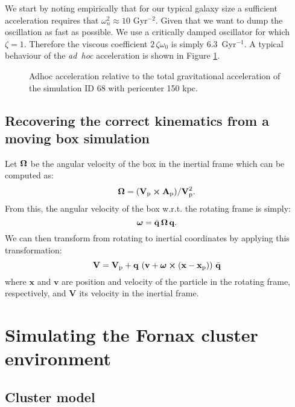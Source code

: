 We start by noting empirically that for our typical galaxy size a sufficient acceleration requires that $\omega_n^2\approx 10$ Gyr$^{-2}$.
Given that we want to dump the oscillation as fast as possible. We use a critically damped oscillator  for which $\zeta = 1$. Therefore the viscous coefficient $2\,\zeta\omega_0$ is simply $6.3$~Gyr$^{-1}$.
A typical behaviour of the \emph{ad~hoc} acceleration is shown in Figure \ref{fig:adhoc}.

\begin{figure} %
\centering
\caption{Adhoc acceleration relative to the total gravitational acceleration of the simulation ID 68 with pericenter 150 kpc.}
\label{fig:adhoc}
\end{figure}


\subsection{Recovering the correct kinematics from a moving box simulation}
\label{sec:corret_kinematics}
Let $\boldsymbol{\mathbf{\Omega}}$ be the angular velocity of the box in the inertial frame which can be computed as:
\begin{equation}
 \boldsymbol{\mathbf{\Omega}} = {(\boldsymbol{\mathbf{V}}_{\mathrm p}\cross\boldsymbol{\mathbf{A}}_{\mathrm p})}/{\boldsymbol{\mathbf{V}}_{\mathrm p}^2}.
\end{equation}
From this, the angular velocity of the box w.r.t. the rotating frame is simply:
\begin{equation}
\boldsymbol{\mathbf{\omega}} = \bar{\mathbf{q}}\, \boldsymbol{\mathbf{\Omega}}\, \mathbf{q}.
\end{equation}
We can then transform from rotating to inertial coordinates by applying this transformation:
\begin{equation}
\boldsymbol{\mathbf{V}} = \boldsymbol{\mathbf{V}}_{\mathrm p} + \mathbf{q} \, \left(\boldsymbol{\mathbf{v}} + \boldsymbol{\mathbf{\omega}} \cross (\boldsymbol{\mathbf{x}}-\boldsymbol{\mathbf{x}}_{\mathrm p})\right) \,\bar{\mathbf{q}}
\end{equation}
where $\mathbf x$ and $\mathbf v$ are position and velocity of the particle in the rotating frame, respectively, and $\mathbf V$ its velocity in the inertial frame. %


\section{Simulating the Fornax cluster environment}
\label{sec:fornax_sim}

\subsection{Cluster model}

